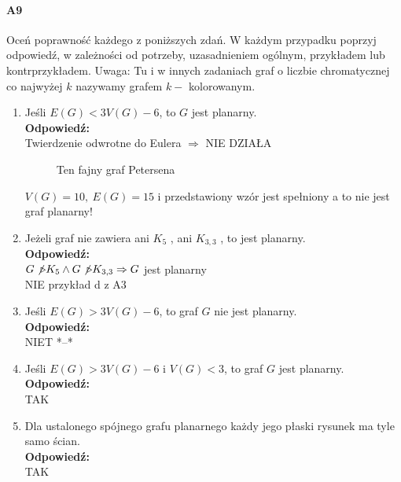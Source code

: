 \documentclass[a4paper,12pt]{article}
\theoremstyle{definition}%
\theoremstyle{definition}
\theoremstyle{problem}
\begin{document}
\paragraph{A9} Oceń poprawność każdego z poniższych zdań. W każdym przypadku poprzyj odpowiedź, w zależności od potrzeby, uzasadnieniem ogólnym, przykładem lub kontrprzykładem. Uwaga: Tu i w innych zadaniach
graf o liczbie chromatycznej co najwyżej $k$ nazywamy grafem $k-$ kolorowanym.
\begin{enumerate}[label=\alph*)]
\item Jeśli $E(G) < 3V(G) - 6$, to $G$ jest planarny.
\\\textbf{Odpowiedź:} \\
Twierdzenie odwrotne do Eulera $\Rightarrow$ NIE DZIAŁA 
\begin{figure}[H]
\centering
{}
\caption*{Ten fajny graf Petersena}
\end{figure}
$V(G)=10,\ E(G)=15$ i przedstawiony wzór jest spełniony a to nie jest graf planarny!

\item Jeżeli graf nie zawiera ani $K_5$ , ani $K_{3,3}$ , to jest planarny.
\\\textbf{Odpowiedź:} \\
$G \not \triangleright K_5 \land G \not \triangleright K_{3,3} \Rightarrow G $ jest planarny\\
NIE przykład d z A3

\item Jeśli $E(G) > 3V(G) - 6$, to graf $G$ nie jest planarny.
\\\textbf{Odpowiedź:} \\
NIET *--*

\item Jeśli $E(G) > 3V(G) - 6$ i $V(G) < 3$, to graf $G$ jest planarny.
\\\textbf{Odpowiedź:} \\ TAK

\item Dla ustalonego spójnego grafu planarnego każdy jego płaski rysunek ma tyle samo ścian.
\\\textbf{Odpowiedź:} \\  TAK


\end{enumerate}
\end{document}
